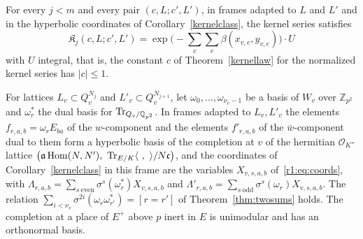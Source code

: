 \begin{hypothesis}\label{r1:hyp:H3}
For every $j<m$ and every pair $(c,L;c',L')$, in frames adapted to $L$ and $L'$ and in the hyperbolic coordinates of Corollary~\ref{kernelclass}, the kernel series satisfies
\[
\mathfrak K_j(c,L;c',L')=\exp\Big(-\sum_v\sum_e\beta(x_{v,e},y_{v,e})\Big)\cdot U
\]
with $U$ integral, that is, the constant $c$ of Theorem~\ref{kernellaw} for the normalized kernel series has $\lvert c\rvert\le1$.
\end{hypothesis}

\begin{lemma}\label{r1:lem:hyp}
For lattices $L_v\subset Q_v^{N_j}$ and $L'_v\subset Q_v^{N_{j+1}}$, let $\omega_0,\dots,\omega_{\nu_v-1}$ be a basis of $W_v$ over $\mathbb Z_{p^2}$ and $\omega^\ast_r$ the dual basis for $\operatorname{Tr}_{Q_v/\mathbb Q_{p^2}}$. In frames adapted to $L_v,L'_v$ the elements $f_{r,a,b}=\omega_rE_{ba}$ of the $w$-component and the elements $f'_{r,a,b}$ of the $\bar w$-component dual to them form a hyperbolic basis of the completion at $v$ of the hermitian $\mathcal O_K$-lattice $\big(\mathfrak a\operatorname{Hom}(N,N'),\ \Tr_{E/K}\langle\ ,\ \rangle/N\mathfrak c\big)$, and the coordinates of Corollary~\ref{kernelclass} in this frame are the variables $X_{v,s,a,b}$ of~\eqref{r1:eq:coords}, with $\Lambda_{r,a,b}=\sum_{s\ \mathrm{even}}\sigma^s(\omega^\ast_r)X_{v,s,a,b}$ and $\Lambda'_{r,a,b}=\sum_{s\ \mathrm{odd}}\sigma^s(\omega_r)X_{v,s,a,b}$. The relation $\sum_{i<\nu_v}\sigma^{2i}(\omega_r\omega^\ast_{r'})=[r=r']$ of Theorem~\ref{thm:twosums} holds. The completion at a place of $E^+$ above $p$ inert in $E$ is unimodular and has an orthonormal basis.
\end{lemma}

